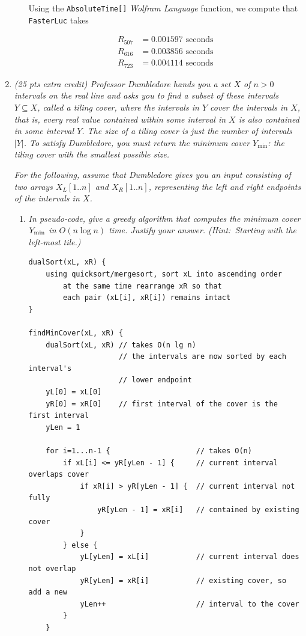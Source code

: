 \documentclass[12pt]{article}
\begin{document}
\begin{enumerate}
\begin{enumerate}
	Using the {\tt AbsoluteTime[]} \textit{Wolfram Language} function, we compute that {\tt FasterLuc} takes
	
	\begin{align*}
	    R_{507} &= 0.001597 \text{ seconds}\\
	    R_{616} &= 0.003856 \text{ seconds}\\
	    R_{723} &= 0.004114 \text{ seconds}
	\end{align*}
	
	\end{enumerate}

    \newpage
	\item \textit{(25 pts extra credit) Professor Dumbledore hands you a set $X$ of $n>0$ intervals on the real line and asks you to find a subset of these intervals $Y\subseteq X$, called a {\em tiling cover}, where the 
intervals in $Y$ cover the intervals in $X$, that is, every real value contained within some interval in $X$ is also contained in some interval $Y$. The {\em size} of a tiling cover is just the number of intervals $|Y|$. To satisfy 
Dumbledore, you must return the minimum cover $Y_{\min}$: the tiling cover with the smallest possible size.}
	
	\textit{For the following, assume that Dumbledore gives you an input consisting of two arrays $X_{L}[1..n]$ and $X_{R}[1..n]$, representing the left and right endpoints of the intervals in $X$. }
	
	\begin{enumerate}

	\item \textit{In pseudo-code, give a {\em greedy} algorithm that computes the minimum cover $Y_{\rm min}$ in $O(n \log n)$ time. Justify your answer. (Hint:\ Starting with the left-most tile.)}
	
	\begin{small}
	\begin{verbatim}
dualSort(xL, xR) {
    using quicksort/mergesort, sort xL into ascending order
        at the same time rearrange xR so that 
        each pair (xL[i], xR[i]) remains intact
}
	
findMinCover(xL, xR) {
    dualSort(xL, xR) // takes O(n lg n)
                     // the intervals are now sorted by each interval's
                     // lower endpoint
    yL[0] = xL[0]
    yR[0] = xR[0]    // first interval of the cover is the first interval
    yLen = 1
    
    for i=1...n-1 {                    // takes O(n)
        if xL[i] <= yR[yLen - 1] {     // current interval overlaps cover
            if xR[i] > yR[yLen - 1] {  // current interval not fully
                yR[yLen - 1] = xR[i]   // contained by existing cover
            }  
        } else {
            yL[yLen] = xL[i]           // current interval does not overlap
            yR[yLen] = xR[i]           // existing cover, so add a new 
            yLen++                     // interval to the cover
        }
    }
    

\end{verbatim}
\end{small}
\end{enumerate}
\end{enumerate}
\end{document}
